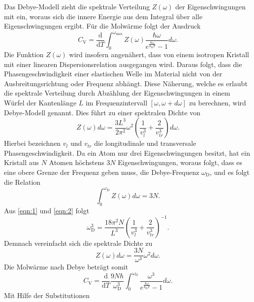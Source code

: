 Das Debye-Modell zieht die spektrale Verteilung $Z(\omega)$ der Eigenschwingungen mit ein, woraus sich die innere Energie aus dem Integral über alle Eigenschwingungen ergibt.
Für die Molwärme folgt der Ausdruck
\begin{equation}
  C_{\text{V}} = \frac{\mathrm{d}}{\mathrm{d}T}\int_{0}^{\omega_{\text{max}}}Z(\omega)\frac{\hbar\omega}{e^{\frac{\hbar\omega}{k_{\text{B}}T}}-1}d\omega.
\end{equation}
Die Funktion $Z(\omega)$ wird insofern angenähert, dass von einem isotropen Kristall mit einer linearen Dispersionsrelation ausgegangen wird.
Daraus folgt, dass die Phasengeschwindigkeit einer elastischen Welle im Material nicht von der Ausbreitungsrichtung oder Frequenz abhängt.
Diese Näherung, welche es erlaubt die spektrale Verteilung durch Abzählung der Eigenschwingungen in einem Würfel der Kantenlänge $L$ im Frequenzintervall $[\omega,\omega+d\omega]$ zu berechnen, wird Debye-Modell genannt.
Dies führt zu einer spektralen Dichte von
\begin{equation}
  Z(\omega)d\omega = \frac{3L^3}{2\pi^2}\omega^2\left(\frac{1}{v_l^3}+\frac{2}{v_{tr}^3}\right)d\omega. \label{eqn:1}
\end{equation}
Hierbei bezeichnen $v_l$ und $v_{tr}$ die longitudinale und transversale Phasengeschwindigkeit.
Da ein Atom nur drei Eigenschwingungen besitzt, hat ein Kristall aus $N$ Atomen höchstens $3N$ Eigenschwingungen, woraus folgt, dass es eine obere Grenze der Frequenz geben muss, die Debye-Frequenz $\omega_{\text{D}}$, und es folgt die Relation
\begin{equation}
  \int_{0}^{\omega_{\text{D}}}Z(\omega)d\omega = 3N. \label{eqn:2}
\end{equation}
Aus \eqref{eqn:1} und \eqref{eqn:2} folgt
\begin{equation}
  \omega_{\text{D}}^3 = \frac{18\pi^2N}{L^3}\left(\frac{1}{v_l^3}+\frac{2}{v_{tr}^3} \right)^{-1}. \label{eqn:3}
\end{equation}
Demnach vereinfacht sich die spektrale Dichte zu
\begin{equation}
  Z(\omega)d\omega = \frac{3N}{\omega^3}\omega^2d\omega.
\end{equation}
Die Molwärme nach Debye beträgt somit
\begin{equation}
  C_{\text{V}} = \frac{\mathrm{d}}{\mathrm{d}T}\frac{9N\hbar}{\omega_{\text{D}}^3} \int_{0}^{\omega_{\text{D}}}\frac{\omega^3}{e^{\frac{\hbar\omega}{k_{\text{B}}T}}-1}d\omega.
\end{equation}
Mit Hilfe der Substitutionen

